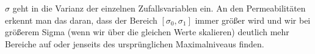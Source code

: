 \begin{figure}[H]
	\centering
\end{figure}
$\sigma$ geht in die Varianz der einzelnen Zufallsvariablen ein. An den Permeabilitäten erkennt man das daran, dass der Bereich $[\sigma_0,\sigma_1] $ immer größer wird und wir bei größerem Sigma (wenn wir über die gleichen Werte skalieren) deutlich mehr Bereiche auf oder jenseits des ursprünglichen Maximalniveaus finden.
